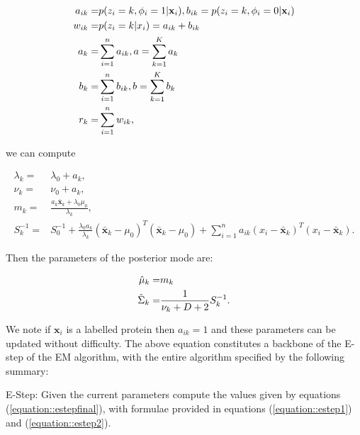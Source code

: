 \documentclass[12pt,english]{article}\usepackage[]{graphicx}\usepackage[]{color}
\begin{document}
\begin{equation}\label{equation::estepfinal}
\begin{split}
a_{ik} = & p(z_i = k, \phi_i = 1|{\bf x}_i), b_{ik} = p(z_i = k, \phi_i = 0|{\bf x}_i) \\
w_{ik} = & p(z_i = k|x_i) = a_{ik} + b_{ik}\\
a_k = & \sum_{i=1}^{n}a_{ik}, a = \sum_{k=1}^{K}a_k \\
b_k = & \sum_{i=1}^{n}b_{ik}, b = \sum_{k=1}^{K}b_k \\
r_k = & \sum_{i=1}^{n}w_{ik},
\end{split}
\end{equation}

we can compute

\begin{equation}\label{equation::Posterior}
\begin{split}
\lambda_k = &\lambda_0 + a_k, \\
\nu_k = & \nu_0 + a_k, \\
m_k = & \frac{a_k\bar{\boldsymbol{x}}_k + \lambda_0\mu_0}{\lambda_k},\\
S_k^{-1}  = & S_0^{-1} + \frac{\lambda_0 a_k}{\lambda_k}(\bar{\boldsymbol{x}}_k - \mu_0)^{T} (\bar{\boldsymbol{x}}_k - \mu_0) + \sum_{i=1}^{n} a_{ik}(x_i -\bar{\boldsymbol{x}}_k)^{T}(x_i -\bar{\boldsymbol{x}}_k).
\end{split}
\end{equation}

Then the parameters of the posterior mode are:

\begin{equation}\label{equation::MAP}
\begin{split}
\hat{{\bf\mu}}_k = &m_k \\
\hat{\Sigma}_k = &\frac{1}{\nu_k + D + 2}S_k^{-1}.
\end{split}
\end{equation}

We note if $\boldsymbol{x}_i$ is a labelled protein then $a_{ik} = 1$
and these parameters can be updated without difficulty.  The above
equation constitutes a backbone of the E-step of the EM algorithm, with
the entire algorithm specified by the following summary:


E-Step: Given the current parameters compute the values given by
equations (\ref{equation::estepfinal}), with formulae provided in
equations (\ref{equation::estep1}) and (\ref{equation::estep2}).

\bigskip
\end{document}
